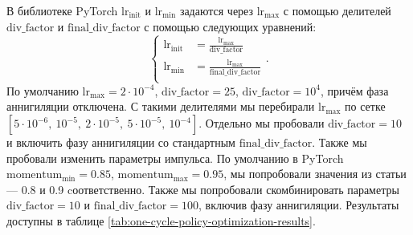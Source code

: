\documentclass[a4paper,14pt]{extarticle}
\begin{document}
    В библиотеке PyTorch $\text{lr}_\text{init}$ и $\text{lr}_\text{min}$ задаются через $\text{lr}_\text{max}$ с помощью делителей $\text{div\_factor}$ и $\text{final\_div\_factor}$ с помощью следующих уравнений:
    \begin{equation*}
        \left\{
        \begin{aligned}
            \text{lr}_\text{init} &= \frac{\text{lr}_\text{max}}{\text{div\_factor}}\\
            \text{lr}_\text{min} &= \frac{\text{lr}_\text{max}}{\text{final\_div\_factor}}\\
        \end{aligned}
        \right..
    \end{equation*}
    По умолчанию $\text{lr}_\text{max} = 2 \cdot 10^{-4}$, $\text{div\_factor} = 25$, $\text{div\_factor} = 10^4$, причём фаза аннигиляции отключена. С такими делителями мы перебирали $\text{lr}_\text{max}$ по сетке $[5 \cdot 10^{-6},\ 10^{-5},\ 2 \cdot 10^{-5},\ 5 \cdot 10^{-5},\ 10^{-4}]$. Отдельно мы пробовали $\text{div\_factor} = 10$ и включить фазу аннигиляции со стандартным $\text{final\_div\_factor}$. Также мы пробовали изменить параметры импульса. По умолчанию в PyTorch $\text{momentum}_\text{min} = 0.85$, $\text{momentum}_\text{max} = 0.95$, мы попробовали значения из статьи --- 0.8 и 0.9 cоответственно. Также мы попробовали скомбинировать параметры $\text{div\_factor} = 10$ и $\text{final\_div\_factor} = 100$, включив фазу аннигиляции. Результаты доступны в таблице \ref{tab:one-cycle-policy-optimization-results}.
\end{document}
